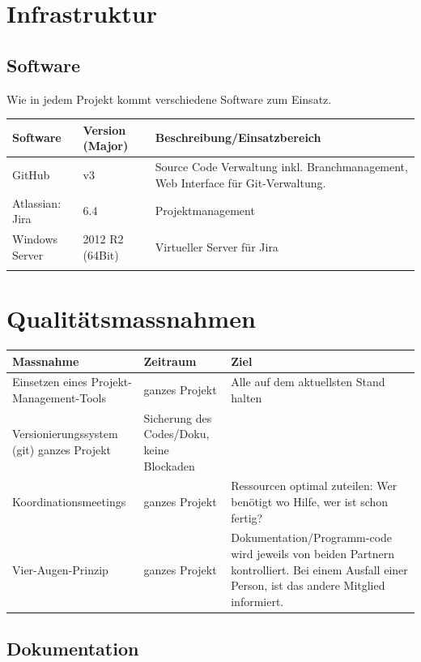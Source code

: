 \section*{Infrastruktur}
\subsection*{Software}
Wie in jedem Projekt kommt verschiedene Software zum Einsatz. \\

\begin{tabularx}{\textwidth}{llX}
	\textbf{Software}	& \textbf{Version (Major)} & \textbf{Beschreibung/Einsatzbereich} \\ \hline
	GitHub	& v3 & Source Code Verwaltung inkl. Branchmanagement, Web Interface für Git-Verwaltung. \\ \hline
	Atlassian: Jira & 6.4 & Projektmanagement \\ \hline
	Windows Server	& 2012 R2 (64Bit) & Virtueller Server für Jira \\ \hline
	\tbd & \tbd & \tbd \\ \hline
\end{tabularx}
\pagebreak

\section*{Qualitätsmassnahmen}

\begin{tabularx}{\textwidth}{XXX}
	\textbf{Massnahme}	& \textbf{Zeitraum} & \textbf{Ziel} \\ \hline
	Einsetzen eines Projekt-Management-Tools & ganzes Projekt & Alle auf dem aktuellsten Stand halten \\ \hline
	Versionierungssystem (git) ganzes Projekt & Sicherung des Codes/Doku, keine Blockaden \\ \hline
	Koordinationsmeetings & ganzes Projekt & Ressourcen optimal zuteilen: Wer benötigt wo Hilfe, wer ist schon fertig? \\ \hline
	Vier-Augen-Prinzip & ganzes Projekt & Dokumentation/Programm-code wird jeweils von beiden Partnern kontrolliert. Bei einem Ausfall einer Person, ist das andere Mitglied informiert. \\ \hline
\end{tabularx}

\subsection*{Dokumentation}
